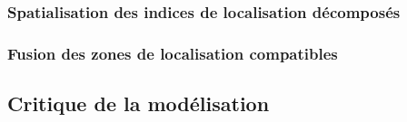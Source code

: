 \subsubsection{Spatialisation des indices de localisation décomposés}
\label{subsec:9-2-2-3}

\subsubsection{Fusion des zones de localisation compatibles}
\label{subsec:9-2-2-4}


\subsection{Critique de la modélisation}
\label{subsec:9-2-3}


